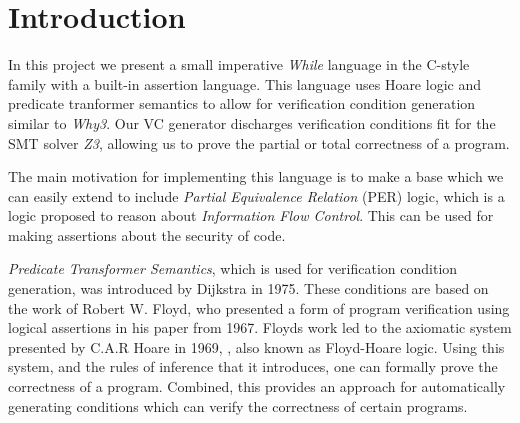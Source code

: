 \section{Introduction}



In this project we present a small imperative \textit{While} language in the C-style family with a built-in assertion language.
This language uses Hoare logic and predicate tranformer semantics to allow for verification condition generation similar to \textit{Why3}.
Our VC generator discharges verification conditions fit for the SMT solver \textit{Z3}, allowing us to prove the partial or total correctness of a program.

The main motivation for implementing this language is to make a base which we can easily extend to include \textit{Partial Equivalence Relation} (PER) logic, which is a logic proposed to reason about \textit{Information Flow Control}\cite{}. This can be used for making assertions about the security of code.

\textit{Predicate Transformer Semantics}, which is used for verification condition generation, was introduced by Dijkstra in 1975\cite{Dijkstra}.
These conditions are based on the work of Robert W. Floyd, who presented a form of program verification using logical assertions in his paper from 1967\cite{Floyd1967}. Floyds work led to the axiomatic system presented by C.A.R Hoare in 1969, \cite{Hoare}, also known as Floyd-Hoare logic. Using this system, and the rules of inference that it introduces, one can formally prove the correctness of a program.
Combined, this provides an approach for automatically generating conditions which can verify the correctness of certain programs.

